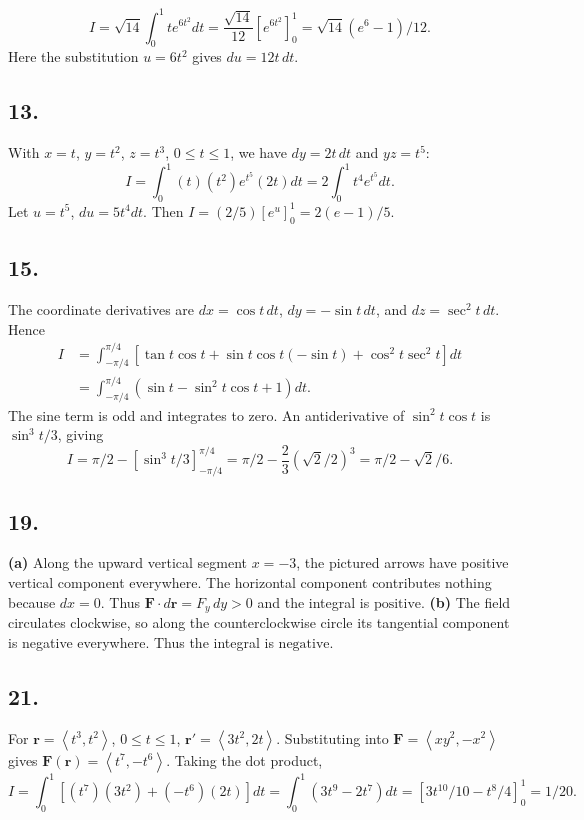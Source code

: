 \documentclass[11pt]{article}
\newcommand{\ex}[1]{\subsection*{#1.}}
\newcommand{\ans}[1]{\boxed{#1}}
\newcommand{\vv}[1]{\left\langle #1\right\rangle}
\begin{document}
\[I=\sqrt{14}\int_0^1te^{6t^2}dt=\frac{\sqrt{14}}{12}[e^{6t^2}]_0^1=\ans{\sqrt{14}(e^6-1)/12}.\]
Here the substitution $u=6t^2$ gives $du=12t\,dt$.
\ex{13}
With $x=t$, $y=t^2$, $z=t^3$, $0\le t\le1$, we have $dy=2t\,dt$ and $yz=t^5$:
\[I=\int_0^1(t)(t^2)e^{t^5}(2t)dt=2\int_0^1t^4e^{t^5}dt.\]
Let $u=t^5$, $du=5t^4dt$. Then $I=(2/5)[e^u]_0^1=\ans{2(e-1)/5}$.
\ex{15}
The coordinate derivatives are $dx=\cos t\,dt$, $dy=-\sin t\,dt$, and $dz=\sec^2t\,dt$. Hence
\begin{align*}
I&=\int_{-\pi/4}^{\pi/4}[\tan t\cos t+\sin t\cos t(-\sin t)+\cos^2t\sec^2t]dt\\
&=\int_{-\pi/4}^{\pi/4}(\sin t-\sin^2t\cos t+1)dt.
\end{align*}
The sine term is odd and integrates to zero. An antiderivative of $\sin^2t\cos t$ is $\sin^3t/3$, giving
\[I=\pi/2-[\sin^3t/3]_{-\pi/4}^{\pi/4}
=\pi/2-\frac23(\sqrt2/2)^3=\ans{\pi/2-\sqrt2/6}.\]
\ex{19}
\textbf{(a)} Along the upward vertical segment $x=-3$, the pictured arrows have positive vertical component everywhere. The horizontal component contributes nothing because $dx=0$. Thus $\mathbf F\cdot d\mathbf r=F_y\,dy>0$ and the integral is $\ans{\text{positive}}$.
\textbf{(b)} The field circulates clockwise, so along the counterclockwise circle its tangential component is negative everywhere. Thus the integral is $\ans{\text{negative}}$.
\ex{21}
For $\mathbf r=\vv{t^3,t^2}$, $0\le t\le1$, $\mathbf r'=\vv{3t^2,2t}$. Substituting into $\mathbf F=\vv{xy^2,-x^2}$ gives $\mathbf F(\mathbf r)=\vv{t^7,-t^6}$. Taking the dot product,
\[I=\int_0^1[(t^7)(3t^2)+(-t^6)(2t)]dt
=\int_0^1(3t^9-2t^7)dt=[3t^{10}/10-t^8/4]_0^1=\ans{1/20}.\]
\end{document}
